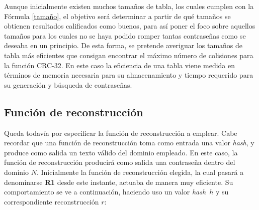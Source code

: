 \documentclass[12pt,spanish,listoffigures,listoftables,listofalgorithms]{tfgetsinf}
\newcommand{\hash}{\textit{hash}}
\begin{document}

    

    

Aunque inicialmente existen muchos tamaños de tabla, los cuales cumplen con la Fórmula \ref{tamaño}, el objetivo será determinar a partir de qué tamaños se obtienen resultados calificados como buenos, para así poner el foco sobre aquellos tamaños para los cuales no se haya podido romper tantas contraseñas como se deseaba en un principio. De esta forma, se pretende averiguar los tamaños de tabla más eficientes que consigan encontrar el máximo número de colisiones para la función CRC-32. En este caso la eficiencia de una tabla viene medida en términos de memoria necesaria para su almacenamiento y tiempo requerido para su generación y búsqueda de contraseñas.

\subsection{Función de reconstrucción}

Queda todavía por especificar la función de reconstrucción a emplear. Cabe recordar que una función de reconstrucción toma como entrada una valor \hash, y produce como salida un texto válido del dominio empleado. En este caso, la función de reconstrucción producirá como salida una contraseña dentro del dominio $N$. Inicialmente la función de reconstrucción elegida, la cual pasará a denominarse \textbf{R1} desde este instante, actuaba de manera muy eficiente. Su comportamiento se ve a continuación, haciendo uso un valor \hash~$h$ y su correspondiente reconstrucción $r$:
\end{document}

